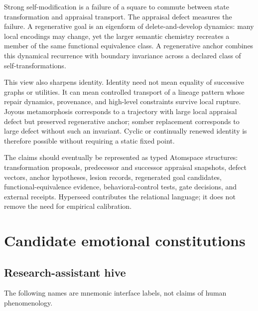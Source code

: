 \documentclass[11pt]{article}
\begin{document}
Strong self-modification is a failure of a square to commute between state
transformation and appraisal transport.  The appraisal defect measures the
failure.  A regenerative goal is an eigenform of delete-and-develop dynamics:
many local encodings may change, yet the larger semantic chemistry recreates a
member of the same functional equivalence class.  A regenerative anchor combines
this dynamical recurrence with boundary invariance across a declared class of
self-transformations.

This view also sharpens identity.  Identity need not mean equality of successive
graphs or utilities.  It can mean controlled transport of a lineage pattern
whose repair dynamics, provenance, and high-level constraints survive local
rupture.  Joyous metamorphosis corresponds to a trajectory with large local
appraisal defect but preserved regenerative anchor; somber replacement
corresponds to large defect without such an invariant.  Cyclic or continually
renewed identity is therefore possible without requiring a static fixed point.

The claims should eventually be represented as typed Atomspace structures:
transformation proposals, predecessor and successor appraisal snapshots,
defect vectors, anchor hypotheses, lesion records, regenerated goal candidates,
functional-equivalence evidence, behavioral-control tests, gate decisions, and
external receipts.  Hyperseed contributes the relational language; it does not
remove the need for empirical calibration.

\section{Candidate emotional constitutions}

\subsection{Research-assistant hive}

The following names are mnemonic interface labels, not claims of human
phenomenology.
\end{document}
